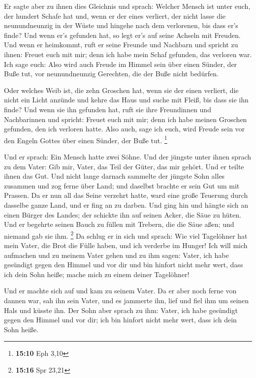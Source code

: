  Er sagte aber zu ihnen dies Gleichnis und sprach:
 Welcher Mensch ist unter euch, der hundert Schafe hat und,
wenn er der eines verliert, der nicht lasse die neunundneunzig in der
Wüste und hingehe nach dem verlorenen, bis dass er's finde? 
Und wenn er's gefunden hat, so legt er's auf seine Achseln mit Freuden.
 Und wenn er heimkommt, ruft er seine Freunde und Nachbarn
und spricht zu ihnen: Freuet euch mit mir; denn ich habe mein Schaf
gefunden, das verloren war.  Ich sage euch: Also wird auch
Freude im Himmel sein über einen Sünder, der Buße tut, vor
neunundneunzig Gerechten, die der Buße nicht bedürfen.

 Oder welches Weib ist, die zehn Groschen hat, wenn sie der
einen verliert, die nicht ein Licht anzünde und kehre das Haus und suche
mit Fleiß, bis dass sie ihn finde?  Und wenn sie ihn
gefunden hat, ruft sie ihre Freundinnen und Nachbarinnen und spricht:
Freuet euch mit mir; denn ich habe meinen Groschen gefunden, den ich
verloren hatte.  Also auch, sage ich euch, wird Freude sein
vor den Engeln Gottes über einen Sünder, der Buße tut. \footnote{\textbf{15:10}
  Eph 3,10}

 Und er sprach: Ein Mensch hatte zwei Söhne. 
Und der jüngste unter ihnen sprach zu dem Vater: Gib mir, Vater, das
Teil der Güter, das mir gehört. Und er teilte ihnen das Gut.
 Und nicht lange darnach sammelte der jüngste Sohn alles
zusammen und zog ferne über Land; und daselbst brachte er sein Gut um
mit Prassen.  Da er nun all das Seine verzehrt hatte, ward
eine große Teuerung durch dasselbe ganze Land, und er fing an zu darben.
 Und ging hin und hängte sich an einen Bürger des Landes;
der schickte ihn auf seinen Acker, die Säue zu hüten.  Und
er begehrte seinen Bauch zu füllen mit Trebern, die die Säue aßen; und
niemand gab sie ihm. \footnote{\textbf{15:16} Spr 23,21} 
Da schlug er in sich und sprach: Wie viel Tagelöhner hat mein Vater, die
Brot die Fülle haben, und ich verderbe im Hunger!  Ich will
mich aufmachen und zu meinem Vater gehen und zu ihm sagen: Vater, ich
habe gesündigt gegen den Himmel und vor dir  und bin
hinfort nicht mehr wert, dass ich dein Sohn heiße; mache mich zu einem
deiner Tagelöhner!

 Und er machte sich auf und kam zu seinem Vater. Da er aber
noch ferne von dannen war, sah ihn sein Vater, und es jammerte ihn, lief
und fiel ihm um seinen Hals und küsste ihn.  Der Sohn aber
sprach zu ihm: Vater, ich habe gesündigt gegen den Himmel und vor dir;
ich bin hinfort nicht mehr wert, dass ich dein Sohn heiße.

